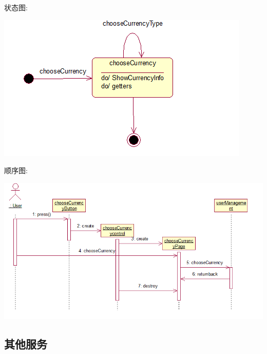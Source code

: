 \documentclass[11pt]{article}
\begin{document}
			状态图: 
			\begin{center}
			\includegraphics[scale=0.42]{选择货币状态图.png}
			\end{center}

			顺序图: 
			\begin{center}
			\includegraphics[scale=0.42]{选择货币顺序图.png}
			\end{center}


	\subsection{其他服务}
\end{document}
